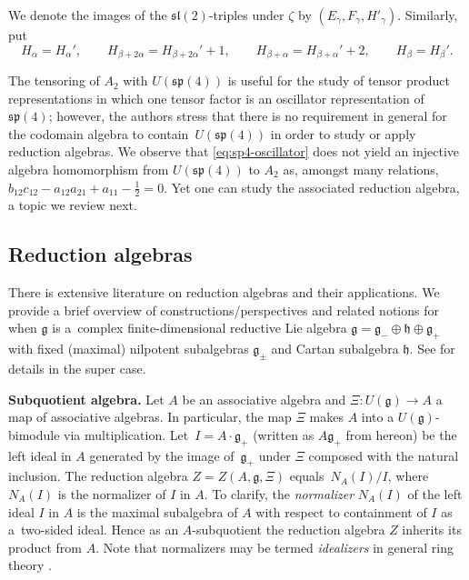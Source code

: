 \documentclass[pdftex]{sigma}
\numberwithin{equation}{section}
\begin{document}
We denote the images of the $\mathfrak{sl}(2)$-triples under $\zeta$ by $(E_\gamma,F_\gamma,H'_\gamma)$.
Similarly, put
\[H_\alpha = H_\alpha',\qquad H_{\beta+2\alpha}=H_{\beta+2\alpha}'+1,\qquad H_{\beta+\alpha}=H_{\beta+\alpha}'+2,\qquad H_\beta=H_\beta'.\]

\begin{Remark}
	The tensoring of $A_{2}$ with $U(\mathfrak{sp}(4))$ is useful for the study of tensor product representations in which one tensor factor is an oscillator representation of $\mathfrak{sp}(4)$; however, the authors stress that there is no requirement in general for the codomain algebra to contain~$U(\mathfrak{sp}(4))$ in order to study or apply reduction algebras. We observe that \eqref{eq:sp4-oscillator} does not yield an injective algebra homomorphism from $U(\mathfrak{sp}(4))$ to $A_{2}$ as, amongst many relations, $b_{12}c_{12} - a_{12}a_{21} + a_{11} - \frac{1}{2} = 0$. Yet one can study the associated reduction algebra, a topic we review next.
\end{Remark}

\subsection{Reduction algebras}\label{subsec:ReductionAlgebras}
There is extensive literature \cite{ashtonRmatrixMickelssonAlgebras2015,hartwigGhostCenterRepresentations2023,khoroshkinMickelssonAlgebrasZhelobenko2008,herlemontRingsHdeformedDifferential2017,vandenhomberghNoteMickelssonStep1975,zhelobenkoExtremalProjectorsGeneralized1989,zhelobenkoHypersymmetriesExtremalEquations1997} on reduction algebras and their applications.
We provide a brief overview of constructions/perspectives and related notions for when $\mathfrak{g}$ is a~complex finite-dimensional reductive Lie algebra $\mathfrak{g}=\mathfrak{g}_{-}\oplus\mathfrak{h}\oplus\mathfrak{g}_{+}$ with fixed (maximal) nilpotent subalgebras $\mathfrak{g}_{\pm}$ and Cartan subalgebra $\mathfrak{h}$. See \cite[Section~2]{hartwigDiagonalReductionAlgebra2022c} for details in the super case.

{\bf Subquotient algebra.} Let $A$ be an associative algebra and $\Xi\colon U(\mathfrak{g})\to A$ a map of associative algebras. In particular, the map $\Xi$ makes $A$ into a $U(\mathfrak{g})$-bimodule via multiplication. Let~${I=A\cdot \mathfrak{g}_+}$ (written as $A\mathfrak{g}_+$ from hereon) be the left ideal in $A$ generated by the image of~$\mathfrak{g}_+$ under $\Xi$ composed with the natural inclusion. The reduction algebra $Z = Z(A,\mathfrak{g},\Xi)$ equals~${N_{A}(I)/I}$, where $N_{A}(I)$ is the normalizer of $I$ in $A$. To clarify, the \emph{normalizer} $N_{A}(I)$ of the left ideal $I$ in $A$ is the maximal subalgebra of $A$ with respect to containment of $I$ as a~two-sided ideal. Hence as an $A$-subquotient the reduction algebra $Z$ inherits its product from $A$. Note that normalizers may be termed \emph{idealizers} in general ring theory \cite[specifically Section~2 for historical context]{jacobsonNonCommutativePolynomialsCyclic1934}.
\end{document}
